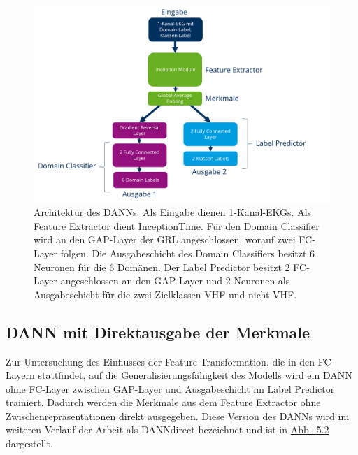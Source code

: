 \begin{figure}[!ht]%
\centering
	\includegraphics[width=1\textwidth]{./Bilder/DANN_architektur.png}
\caption[DANN Architektur]{Architektur des \gls{DANN}s. Als Eingabe dienen 1-Kanal-\gls{EKG}s. Als Feature Extractor dient InceptionTime. Für den Domain Classifier wird an den \gls{GAP}-Layer der \gls{GRL} angeschlossen, worauf zwei \gls{FC}-Layer folgen. Die Ausgabeschicht des Domain Classifiers besitzt 6 Neuronen für die 6 Domänen. Der Label Predictor besitzt 2 \gls{FC}-Layer angeschlossen an den \gls{GAP}-Layer und 2 Neuronen als Ausgabeschicht für die zwei Zielklassen \gls{VHF} und nicht-\gls{VHF}.} 
\label{fig:DANN}
\end{figure} 

\subsection*{DANN mit Direktausgabe der Merkmale}

Zur Untersuchung des Einflusses der Feature-Transformation, die in den \gls{FC}-Layern stattfindet, auf die Generalisierungsfähigkeit des Modells wird ein \gls{DANN} ohne \gls{FC}-Layer zwischen \gls{GAP}-Layer und Ausgabeschicht im Label Predictor trainiert. Dadurch werden die Merkmale aus dem Feature Extractor ohne Zwischenrepräsentationen direkt ausgegeben. Diese Version des \gls{DANN}s wird im weiteren Verlauf der Arbeit als DANNdirect bezeichnet und ist in \hyperref[fig:DANNdirect]{Abb.~5.2} dargestellt.

